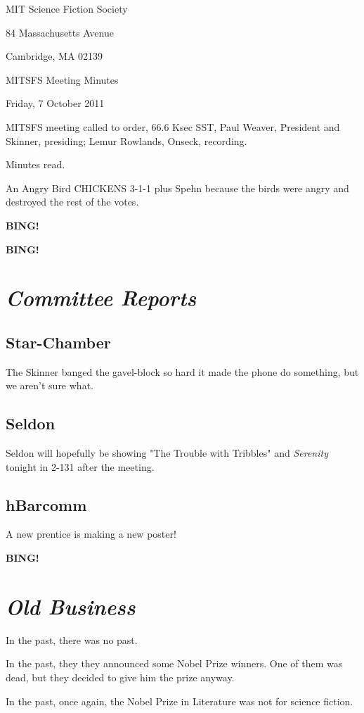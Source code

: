 \documentclass[10pt]{article}
\newcommand{\bing}{{\bf BING!} }
\newcommand{\goto}[1]{\bing \vskip 12pt \section*{{\em{#1}}}}
\newcommand{\ps}{ plus Spehn\xspace}
\newcommand{\skinner}{Paul Weaver, President and Skinner}
\newcommand{\onseck}{Lemur Rowlands, Onseck}
\newcommand{\meetingdate}{Friday, 7 October 2011}
\begin{document}
\begin{center}

MIT Science Fiction Society

84 Massachusetts Avenue

Cambridge, MA 02139

\vspace{12pt}

MITSFS Meeting Minutes

\meetingdate

\end{center}

\vspace{18pt}

\setlength{\parskip}{6pt}

\noindent
MITSFS meeting called to order, 66.6 Ksec SST,
\skinner, presiding; \onseck, recording.

Minutes read.

An Angry Bird CHICKENS 3-1-1\ps because the birds were angry and destroyed
the rest of the votes.

\bing

\goto{Committee Reports}

\subsection*{Star-Chamber}

The Skinner banged the gavel-block so hard it made the phone do
something, but we aren't sure what.

\subsection*{Seldon}

Seldon will hopefully be showing "The Trouble with Tribbles" and \emph{Serenity}
tonight in 2-131 after the meeting.


\subsection*{hBarcomm}

A new prentice is making a new poster!


\goto{Old Business}

In the past, there was no past.

In the past, they they announced some Nobel Prize winners.  One of them
was dead, but they decided to give him the prize anyway.

In the past, once again, the Nobel Prize in Literature was not for
science fiction.
\end{document}
